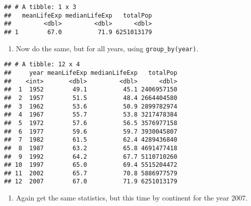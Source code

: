 \documentclass[]{article}
\newenvironment{Shaded}{\begin{snugshade}}{\end{snugshade}}
\newcommand{\KeywordTok}[1]{\textcolor[rgb]{0.13,0.29,0.53}{\textbf{#1}}}
\newcommand{\DataTypeTok}[1]{\textcolor[rgb]{0.13,0.29,0.53}{#1}}
\newcommand{\DecValTok}[1]{\textcolor[rgb]{0.00,0.00,0.81}{#1}}
\newcommand{\StringTok}[1]{\textcolor[rgb]{0.31,0.60,0.02}{#1}}
\newcommand{\OperatorTok}[1]{\textcolor[rgb]{0.81,0.36,0.00}{\textbf{#1}}}
\newcommand{\NormalTok}[1]{#1}
\providecommand{\tightlist}{%
  \setlength{\itemsep}{0pt}\setlength{\parskip}{0pt}}
\begin{document}
\begin{verbatim}
## # A tibble: 1 x 3
##   meanLifeExp medianLifeExp   totalPop
##         <dbl>         <dbl>      <dbl>
## 1        67.0          71.9 6251013179
\end{verbatim}

\begin{enumerate}
\def\labelenumi{\arabic{enumi}.}
\setcounter{enumi}{7}
\tightlist
\item
  Now do the same, but for all years, using \texttt{group\_by(year)}.
\end{enumerate}

\begin{Shaded}
\end{Shaded}

\begin{verbatim}
## # A tibble: 12 x 4
##     year meanLifeExp medianLifeExp   totalPop
##    <int>       <dbl>         <dbl>      <dbl>
##  1  1952        49.1          45.1 2406957150
##  2  1957        51.5          48.4 2664404580
##  3  1962        53.6          50.9 2899782974
##  4  1967        55.7          53.8 3217478384
##  5  1972        57.6          56.5 3576977158
##  6  1977        59.6          59.7 3930045807
##  7  1982        61.5          62.4 4289436840
##  8  1987        63.2          65.8 4691477418
##  9  1992        64.2          67.7 5110710260
## 10  1997        65.0          69.4 5515204472
## 11  2002        65.7          70.8 5886977579
## 12  2007        67.0          71.9 6251013179
\end{verbatim}

\begin{enumerate}
\def\labelenumi{\arabic{enumi}.}
\setcounter{enumi}{8}
\tightlist
\item
  Again get the same statistics, but this time by continent for the year
  2007.
\end{enumerate}

\begin{Shaded}
\end{Shaded}
\end{document}
